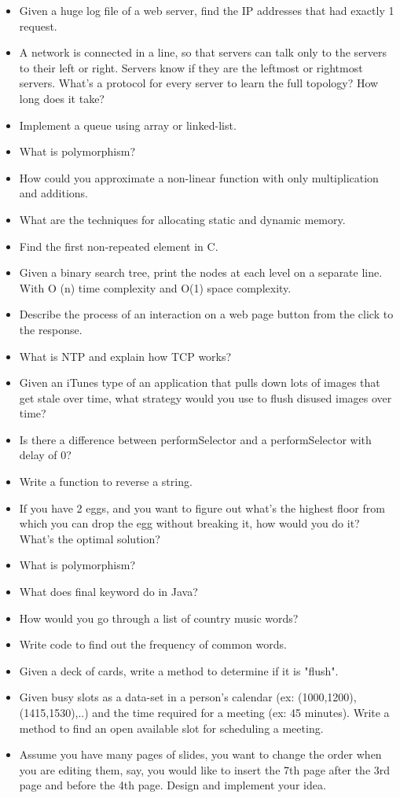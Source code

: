 \documentclass{article}
\begin{document}
\begin{itemize}
	\item Given a huge log file of a web server, find the IP addresses that had exactly 1 request.
	\item A network is connected in a line, so that servers can talk only to the servers to their left or right. Servers know if they are the leftmost or rightmost servers. What's a protocol for every server to learn the full topology? How long does it take?
	\item Implement a queue using array or linked-list.
	\item What is polymorphism?
	\item How could you approximate a non-linear function with only multiplication and additions. 
	\item What are the techniques for allocating static and dynamic memory.
	\item Find the first non-repeated element in C.
	\item Given a binary search tree, print the nodes at each level on a separate line. With O (n) time complexity and O(1) space complexity.
	\item Describe the process of an interaction on a web page button from the click to the response.
	\item What is NTP and explain how TCP works?
	\item Given an iTunes type of an application that pulls down lots of images that get stale over time, what strategy would you use to flush disused images over time?
	\item Is there a difference between performSelector and a performSelector with delay of 0?
	\item Write a function to reverse a string.
	\item If you have 2 eggs, and you want to figure out what's the highest floor from which you can drop the egg without breaking it, how would you do it? What's the optimal solution?
	\item What is polymorphism?
	\item What does final keyword do in Java?
	\item How would you go through a list of country music words?
	\item Write code to find out the frequency of common words.
	\item Given a deck of cards, write a method to determine if it is "flush".
	\item Given busy slots as a data-set in a person's calendar (ex: {(1000,1200),(1415,1530),..}) and the time required for a meeting (ex: 45 minutes). Write a method to find an open available slot for scheduling a meeting.
	\item Assume you have many pages of slides, you want to change the order when you are editing them, say, you would like to insert the 7th page after the 3rd page and before the 4th page. Design and implement your idea.
\end{itemize}
\end{document}
